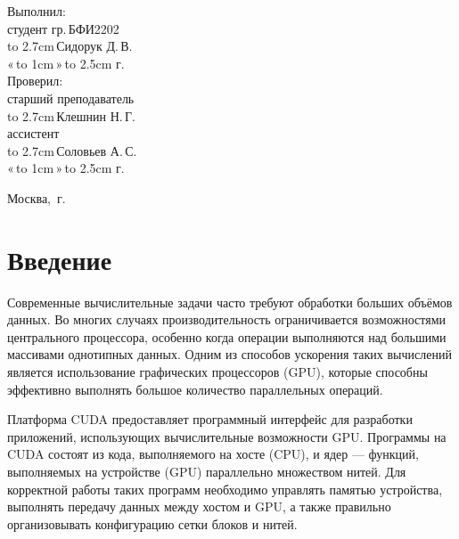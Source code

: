 \documentclass[14pt]{extarticle}
\makeatletter
\newcommand{\hrf}[1]{\hbox to #1{\hrulefill}} %
\newcounter{sectionc} %
\newcommand{\numbersections}{\renewcommand{\Hy@numberline}[1]{##1~}}
\newcommand{\nonumbersections}{\renewcommand{\Hy@numberline}[1]{}}
\let\oldsection\section
\renewcommand{\section}{\numbersections\oldsection}
\let\oldsectionc\sectionc
\renewcommand{\sectionc}{\nonumbersections\oldsectionc}
\renewcommand\tableofcontents{
	\pdfbookmark[sectionc]{\contentsname}{toc} %
	\sectionc*{\contentsname
		\@mkboth{\contentsname}{\contentsname}}
	\@starttoc{toc}
}
\makeatother
\begin{document}
\vfill %

\hfill %
\begin{minipage}{0.45\textwidth} %
	Выполнил:\\[2mm]
	студент гр.\,БФИ2202\\[2mm]
	\hrf{2.7cm}\,Сидорук Д.\,В.\\[2mm]
	«\,\hrf{1cm}\,»\,\hrf{2.5cm}\,\the\year{}\,г.\\[5mm]
	
	Проверил:\\[2mm]
	старший преподаватель\\[2mm]
	\hrf{2.7cm}\,Клешнин Н.\,Г.\\[2mm]
	ассистент\\[2mm]
	\hrf{2.7cm}\,Соловьев А.\,С.\\[2mm]
	«\,\hrf{1cm}\,»\,\hrf{2.5cm}\,\the\year{}\,г.
\end{minipage}%

\vfill

\centerline{Москва, \the\year{}\,г.} %
\thispagestyle{empty} %
\newpage %
\tableofcontents %
\newpage %

\section{Введение}

Современные вычислительные задачи часто требуют обработки больших объёмов данных. Во многих случаях производительность ограничивается возможностями центрального процессора, особенно когда операции выполняются над большими массивами однотипных данных. Одним из способов ускорения таких вычислений является использование графических процессоров (GPU), которые способны эффективно выполнять большое количество параллельных операций.

Платформа CUDA предоставляет программный интерфейс для разработки приложений, использующих вычислительные возможности GPU. Программы на CUDA состоят из кода, выполняемого на хосте (CPU), и ядер — функций, выполняемых на устройстве (GPU) параллельно множеством нитей. Для корректной работы таких программ необходимо управлять памятью устройства, выполнять передачу данных между хостом и GPU, а также правильно организовывать конфигурацию сетки блоков и нитей.
\end{document}
